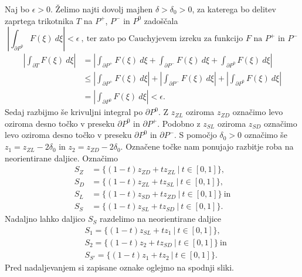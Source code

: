 \documentclass[mat1, tisk]{fmfdelo}
\begin{document}
\begin{dokaz}
        Naj bo $\epsilon > 0$. Želimo najti dovolj majhen $\delta > \delta_0 > 0$, za katerega bo delitev zaprtega trikotnika $T$ na $P^+$, $P^-$ in $P^0$ zadoščala
        $$ 
            \left|\int_{\partial P^0}{F(\xi)~d\xi}\right| < \epsilon~,~\text{ter zato po Cauchyjevem izreku za funkcijo $F$ na $P^+$ in $P^-$}
        $$
        \begin{align*}
            \left|\int_{\partial T}{F(\xi)~d\xi}\right| &= \left|\int_{\partial P^+}{F(\xi)~d\xi} + \int_{\partial P^-}{F(\xi)~d\xi} + \int_{\partial P^0}{F(\xi)~d\xi}\right|\\
            &\leq \left|\int_{\partial P^+}{F(\xi)~d\xi} \right|+ \left|\int_{\partial P^-}{F(\xi)~d\xi}\right| + \left|\int_{\partial P^0}{F(\xi)~d\xi}\right| \\ 
            & =\left|\int_{\partial P^0}{F(\xi)~d\xi} \right| < \epsilon.
        \end{align*}
        Sedaj razbijmo še krivuljni integral po $\partial P^0$. 
        Z $z_{ZL}$ oziroma $z_{ZD}$ označimo levo oziroma desno točko v preseku $\partial P^0$ in $\partial P^+$. 
        Podobno z $z_{SL}$ oziroma $z_{SD}$ označimo levo oziroma desno točko v preseku $\partial P^0$ in $\partial P^-$.
        S pomočjo $\delta_0 > 0$ označimo še $z_1 = z_{ZL} - 2 \delta_0$ in $z_2 = z_{ZD} - 2 \delta_0$.
        Označene točke nam ponujajo razbitje roba na neorientirane daljice. Označimo 
        \begin{align*}
            S_Z &= \{(1-t)z_{ZD} + t z_{ZL}~|~ t \in [0,1]\}, \\
            S_D &= \{(1-t)z_{ZL} + t z_{SL}~|~ t \in [0,1]\}, \\
            S_L &= \{(1-t)z_{SD} + t z_{ZD}~|~ t \in [0,1]\}~\text{in}\\ 
            S_S &= \{(1-t)z_{SL} + t z_{SD}~|~ t \in [0,1]\}.
        \end{align*}
        Nadaljno lahko daljico $S_S$ razdelimo na neorientirane daljice 
        \begin{align*}
            &S_1 = \{(1-t)z_{SL} + t z_{1}~|~ t \in [0,1]\}, \\
            &S_2 = \{(1-t)z_{2} + t z_{SD}~|~ t \in [0,1]\}~\text{in} \\
            &S_{S'} = \{(1-t)z_{1} + t z_{2}~|~ t \in [0,1]\}.
        \end{align*}
        Pred nadaljevanjem si zapisane oznake oglejmo na spodnji sliki. 
        \begin{figure}[H]
            \begin{center}

\end{center}
\end{figure}
\end{dokaz}
\end{document}
